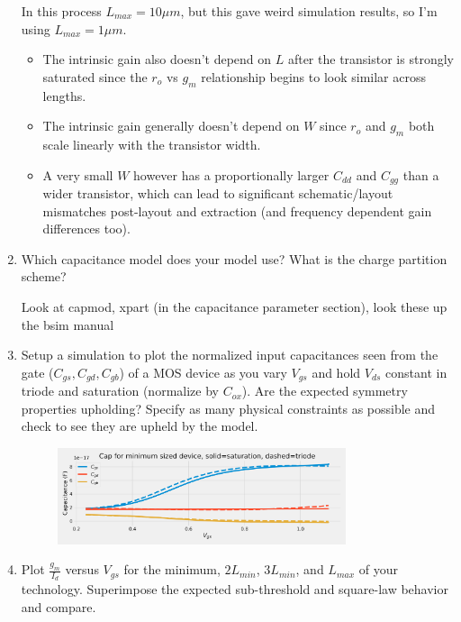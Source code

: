 \begin{enumerate}
    In this process $L_{max} = 10 \mu m$, but this gave weird simulation results, so I'm using $L_{max} = 1 \mu m$.
    \begin{itemize}
        \item The intrinsic gain also doesn't depend on $L$ after the transistor is strongly saturated since the $r_o$ vs $g_m$ relationship begins to look similar across lengths.
        \item The intrinsic gain generally doesn't depend on $W$ since $r_o$ and $g_m$ both scale linearly with the transistor width.
        \item A very small $W$ however has a proportionally larger $C_{dd}$ and $C_{gg}$ than a wider transistor, which can lead to significant schematic/layout mismatches post-layout and extraction (and frequency dependent gain differences too).
    \end{itemize}

\item {\color{blue}Which capacitance model does your model use? What is the charge partition scheme?}

    Look at capmod, xpart (in the capacitance parameter section), look these up the bsim manual

\item {\color{blue}Setup a simulation to plot the normalized input capacitances seen from the gate ($C_{gs}, C_{gd}, C_{gb}$) of a MOS device as you vary $V_{gs}$ and hold $V_{ds}$ constant in triode and saturation (normalize by $C_{ox}$). Are the expected symmetry properties upholding? Specify as many physical constraints as possible and check to see they are upheld by the model.}

    \begin{figure}[H]
        \centering
        \includegraphics[width=0.8\textwidth]{figs/problem7.png}
    \end{figure}

\item {\color{blue}Plot $\frac{g_m}{I_d}$ versus $V_{gs}$ for the minimum, $2 L_{min}$, $3 L_{min}$, and $L_{max}$ of your technology. Superimpose the expected sub-threshold and square-law behavior and compare.}


\end{enumerate}
